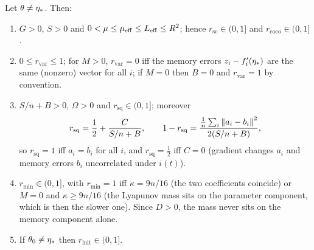 \begin{lemma}\label{lem:B3-ranges}
Let $\theta\ne\eta_\ast$. Then:
\begin{enumerate}[label=(\roman*)]
\item $G>0$, $S>0$ and $0<\mu\le\mu_{\mathrm{eff}}\le L_{\mathrm{eff}}\le R^2$; hence $r_{\mathrm{sc}}\in(0,1]$ and $r_{\mathrm{coco}}\in(0,1]$.
\item $0\le r_{\mathrm{var}}\le1$; for $M>0$, $r_{\mathrm{var}}=0$ iff the memory errors $z_i-f'_i(\eta_\ast)$ are the same (nonzero) vector for all $i$; if $M=0$ then $B=0$ and $r_{\mathrm{var}}=1$ by convention.
\item $S/n+B>0$, $\Omega>0$ and $r_{\mathrm{sq}}\in(0,1]$; moreover
\[
r_{\mathrm{sq}}=\frac12+\frac{C}{S/n+B},\qquad 1-r_{\mathrm{sq}}=\frac{\frac1n\sum_i\left\|a_i-b_i\right\|^2}{2(S/n+B)},
\]
so $r_{\mathrm{sq}}=1$ iff $a_i=b_i$ for all $i$, and $r_{\mathrm{sq}}=\frac12$ iff $C=0$ (gradient changes $a_i$ and memory errors $b_i$ uncorrelated under $i(t)$).
\item $r_{\min}\in(0,1]$, with $r_{\min}=1$ iff $\kappa=9n/16$ (the two coefficients coincide) or $M=0$ and $\kappa\ge9n/16$ (the Lyapunov mass sits on the parameter component, which is then the slower one). Since $D>0$, the mass never sits on the memory component alone.
\item If $\theta_0\ne\eta_\ast$ then $r_{\mathrm{init}}\in(0,1]$.
\end{enumerate}
\end{lemma}
